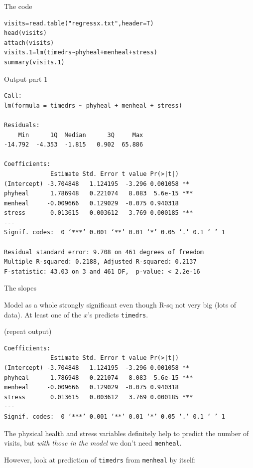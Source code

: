 \documentclass{beamer}
\begin{document}
\begin{frame}[fragile]{The code}


{\small
\begin{verbatim}
visits=read.table("regressx.txt",header=T)
head(visits)
attach(visits)
visits.1=lm(timedrs~phyheal+menheal+stress)
summary(visits.1)
\end{verbatim}
}

\end{frame}

\begin{frame}[fragile]{Output part 1}

{\scriptsize
\begin{verbatim}
Call:
lm(formula = timedrs ~ phyheal + menheal + stress)

Residuals:
    Min      1Q  Median      3Q     Max 
-14.792  -4.353  -1.815   0.902  65.886 

Coefficients:
             Estimate Std. Error t value Pr(>|t|)    
(Intercept) -3.704848   1.124195  -3.296 0.001058 ** 
phyheal      1.786948   0.221074   8.083  5.6e-15 ***
menheal     -0.009666   0.129029  -0.075 0.940318    
stress       0.013615   0.003612   3.769 0.000185 ***
---
Signif. codes:  0 ‘***’ 0.001 ‘**’ 0.01 ‘*’ 0.05 ‘.’ 0.1 ‘ ’ 1 

Residual standard error: 9.708 on 461 degrees of freedom
Multiple R-squared: 0.2188,	Adjusted R-squared: 0.2137 
F-statistic: 43.03 on 3 and 461 DF,  p-value: < 2.2e-16 

\end{verbatim}
}

\end{frame}


\begin{frame}[fragile]{The slopes}

Model as a whole strongly significant even though R-sq not very big (lots of data). At least one of the $x$'s predicts \verb-timedrs-.

(repeat output)

{\scriptsize
\begin{verbatim}
Coefficients:
             Estimate Std. Error t value Pr(>|t|)    
(Intercept) -3.704848   1.124195  -3.296 0.001058 ** 
phyheal      1.786948   0.221074   8.083  5.6e-15 ***
menheal     -0.009666   0.129029  -0.075 0.940318    
stress       0.013615   0.003612   3.769 0.000185 ***
---
Signif. codes:  0 ‘***’ 0.001 ‘**’ 0.01 ‘*’ 0.05 ‘.’ 0.1 ‘ ’ 1 

\end{verbatim}
}

The physical health and stress variables definitely help to predict the number of visits, but {\em with those in the model} we don't need \verb-menheal-.


However, look at prediction of \verb-timedrs- from \verb-menheal- by itself:
  
\end{frame}
\end{document}
